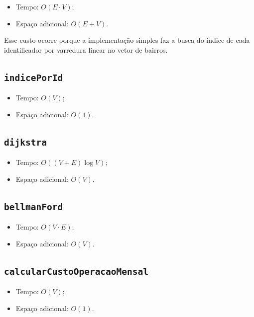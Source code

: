 \documentclass[12pt,a4paper]{article}
\begin{document}
\begin{itemize}[noitemsep]
    \item Tempo: $O(E \cdot V)$;
    \item Espaço adicional: $O(E + V)$.
\end{itemize}

Esse custo ocorre porque a implementação simples faz a busca do índice de cada
identificador por varredura linear no vetor de bairros.

\subsection{\texttt{indicePorId}}

\begin{itemize}[noitemsep]
    \item Tempo: $O(V)$;
    \item Espaço adicional: $O(1)$.
\end{itemize}

\subsection{\texttt{dijkstra}}

\begin{itemize}[noitemsep]
    \item Tempo: $O((V + E)\log V)$;
    \item Espaço adicional: $O(V)$.
\end{itemize}

\subsection{\texttt{bellmanFord}}

\begin{itemize}[noitemsep]
    \item Tempo: $O(V \cdot E)$;
    \item Espaço adicional: $O(V)$.
\end{itemize}

\subsection{\texttt{calcularCustoOperacaoMensal}}

\begin{itemize}[noitemsep]
    \item Tempo: $O(V)$;
    \item Espaço adicional: $O(1)$.
\end{itemize}
\end{document}
